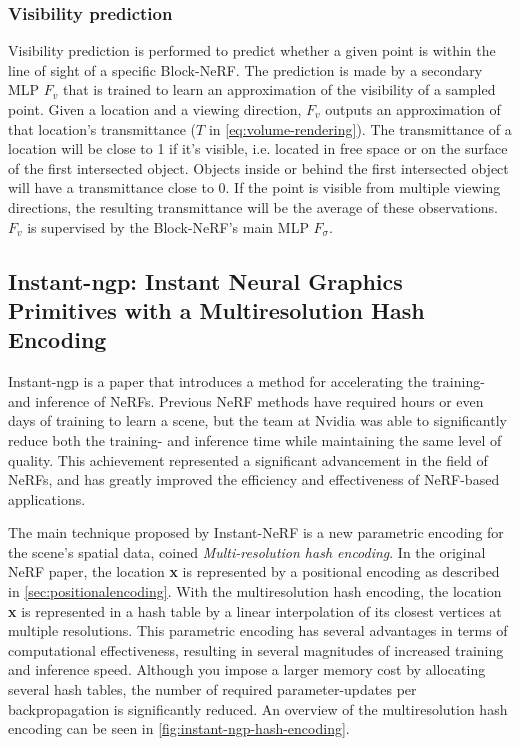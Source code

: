 \subsubsection{Visibility prediction} \label{sec:visibility-prediction}
Visibility prediction is performed to predict whether a given point is within the line of sight of a specific Block-NeRF. The prediction is made by a secondary MLP $F_v$ that is trained to learn an approximation of the visibility of a sampled point. Given a location and a viewing direction, $F_v$ outputs an approximation of that location's transmittance ($T$ in \autoref{eq:volume-rendering}). The transmittance of a location will be close to 1 if it's visible, i.e. located in free space or on the surface of the first intersected object. Objects inside or behind the first intersected object will have a transmittance close to 0. If the point is visible from multiple viewing directions, the resulting transmittance will be the average of these observations. $F_v$ is supervised by the Block-NeRF's main MLP $F_\sigma$.



\subsection[Instant-ngp]{Instant-ngp: Instant Neural Graphics Primitives with a Multiresolution Hash Encoding} \label{sec:instant-ngp}
Instant-ngp \cite{muller_instant_2022} is a paper that introduces a method for accelerating the training- and inference of NeRFs. Previous NeRF methods have required hours or even days of training to learn a scene, but the team at Nvidia was able to significantly reduce both the training- and inference time while maintaining the same level of quality. This achievement represented a significant advancement in the field of NeRFs, and has greatly improved the efficiency and effectiveness of NeRF-based applications.

The main technique proposed by Instant-NeRF is a new parametric encoding for the scene's spatial data, coined \textit{Multi-resolution hash encoding}. In the original NeRF paper, the location \textbf{x} is represented by a positional encoding as described in \autoref{sec:positionalencoding}. With the multiresolution hash encoding, the location \textbf{x} is represented in a hash table by a linear interpolation of its closest vertices at multiple resolutions. This parametric encoding has several advantages in terms of computational effectiveness, resulting in several magnitudes of increased training and inference speed. Although you impose a larger memory cost by allocating several hash tables, the number of required parameter-updates per backpropagation is significantly reduced. An overview of the multiresolution hash encoding can be seen in \autoref{fig:instant-ngp-hash-encoding}.


